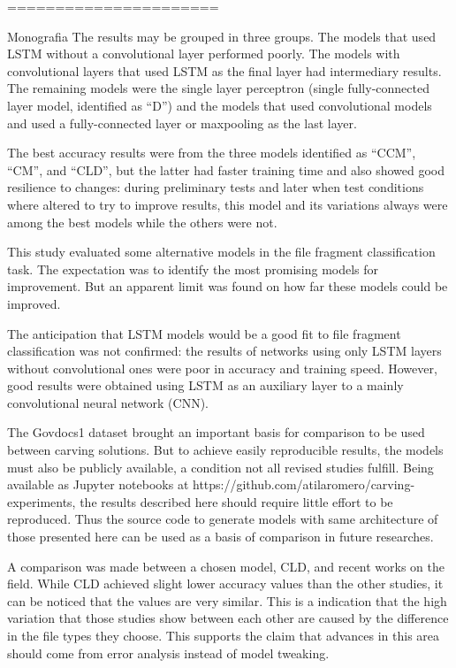 ======================

Monografia
The results may be grouped in three groups. The models that used LSTM without a convolutional layer performed poorly. The models with convolutional layers that used LSTM as the final layer had intermediary results. The remaining models were the single layer perceptron (single fully-connected layer model, identified as ``D'') and the models that used convolutional models and used a fully-connected layer or maxpooling as the last layer.

The best accuracy results were from the three models identified as ``CCM'', ``CM'', and ``CLD'', but the latter had faster training time and also showed good resilience to changes: during preliminary tests and later when test conditions where altered to try to improve results, this model and its variations always were among the best models while the others were not.

This study evaluated some alternative models in the file fragment classification task. The expectation was to identify the most promising models for improvement. But an apparent limit was found on how far these models could be improved. 

The anticipation that LSTM models would be a good fit to file fragment classification was not confirmed: the results of networks using only LSTM layers without convolutional ones were poor in accuracy and training speed. However, good results were obtained using LSTM as an auxiliary layer to a mainly convolutional neural network (CNN). 

The Govdocs1 dataset brought an important basis for comparison to be used between carving solutions. But to achieve easily reproducible results, the models must also be publicly available, a condition not all revised studies fulfill. Being available as Jupyter notebooks at https://github.com/atilaromero/carving-experiments, the results described here should require little effort to be reproduced. Thus the source code to generate models with same architecture of those presented here can be used as a basis of comparison in future researches.

A comparison was made between a chosen model, CLD, and recent works on the field. While CLD achieved slight lower accuracy values than the other studies, it can be noticed that the values are very similar. This is a indication that the high  variation that those studies show between each other are caused by the difference in the file types they choose. This supports the claim that advances in this area should come from error analysis instead of model tweaking.

